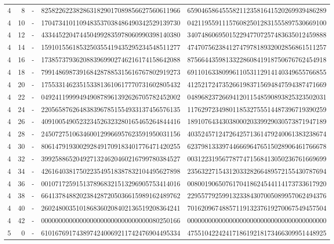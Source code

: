 \begin{longtable}{rrrll}
4 & 8 & - & 8258226223828631829017089856627560611966 & 6590465864555821123581641520269939486289 \\
4 & 10 & - & 1704734101109483537038486490342529139730 & 0421195591115760825012831555897530669100 \\
4 & 12 & - & 4334452204744504992835978060990398140380 & 3407486069501522947707257483635012459888 \\
4 & 14 & - & 1591015561853250355419435295234548511277 & 4747075623841274797818932002856861511257 \\
4 & 16 & - & 1738573793620883969902746216174158642088 & 8756644359813322860841918750676762454918 \\
4 & 18 & - & 7991486987391684287885315616767802919273 & 6911016338099611053112914140349655766855 \\
4 & 20 & - & 1755331462351533813610617770731602805432 & 4125217247352661983715694847594387471669 \\
4 & 22 & - & 0492411999949490878961392626705782452002 & 0489682372669412011548590893825323502031 \\
4 & 24 & - & 2205658762648383967851554933137456576135 & 1176297234980118532755514487396719390259 \\
4 & 26 & - & 4091005490523234526323280165465264844416 & 1891076434303800020339929030573871947189 \\
4 & 28 & - & 2450727510634600129966957623591950031156 & 4035245712472642571361479240061383238674 \\
4 & 30 & - & 8061479193002928491709183401776471420255 & 6237981333974466696476515028906461766678 \\
4 & 32 & - & 3992588652049271324620460216799780384527 & 0031223195677877471568413050236761669699 \\
4 & 34 & - & 4261640381750223549518387832104495627898 & 2356322715431203328266489572155430787694 \\
4 & 36 & - & 0010717259151378968321513296905753414016 & 0080019065076170418624544114173733617920 \\
4 & 38 & - & 6641378488202384287205036615989162489762 & 2295577925991323384307005089957062494376 \\
4 & 40 & - & 2602480035101868360208402136519208364241 & 7016209674885711913237619270067549457504 \\
4 & 42 & - & 0000000000000000000000000000000080250166 & 0000000000000000000000000000000000000000 \\
5 & 0 & - & 6101676917438974240069211742476904495334 & 4755104224241718619218173466309951448925 \\

\end{longtable}
